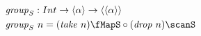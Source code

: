 \documentclass[preview]{standalone}
\begin{document}
\begin{align*}
  \mathit{group}_S &: Int \rightarrow \vect{\alpha} \rightarrow \vect{\vect{\alpha}} \\
  \mathit{group}_S &\ n = (\mathit{take}\ n) \fMapS \circ (\mathit{drop}\ n) \scanS
\end{align*}
\end{document}
